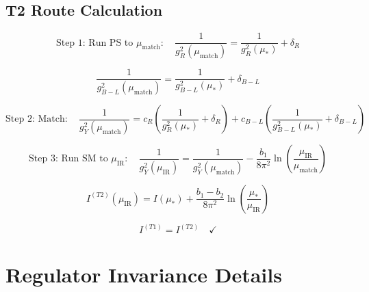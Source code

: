 \documentclass[11pt,a4paper]{article}
\theoremstyle{definition}
\begin{document}
\subsection{T2 Route Calculation}
\label{subsec:T2_detail}

\begin{equation}
\label{eq:T2_step1}
\text{Step 1: Run PS to } \mu_{\text{match}}: \quad \frac{1}{g_R^2(\mu_{\text{match}})} = \frac{1}{g_R^2(\mu_*)} + \delta_R
\end{equation}

\begin{equation}
\label{eq:T2_step2}
\frac{1}{g_{B-L}^2(\mu_{\text{match}})} = \frac{1}{g_{B-L}^2(\mu_*)} + \delta_{B-L}
\end{equation}

\begin{equation}
\label{eq:T2_step3}
\text{Step 2: Match}: \quad \frac{1}{g_Y^2(\mu_{\text{match}})} = c_R\left(\frac{1}{g_R^2(\mu_*)} + \delta_R\right) + c_{B-L}\left(\frac{1}{g_{B-L}^2(\mu_*)} + \delta_{B-L}\right)
\end{equation}

\begin{equation}
\label{eq:T2_step4}
\text{Step 3: Run SM to } \mu_{\text{IR}}: \quad \frac{1}{g_Y^2(\mu_{\text{IR}})} = \frac{1}{g_Y^2(\mu_{\text{match}})} - \frac{b_1}{8\pi^2}\ln\left(\frac{\mu_{\text{IR}}}{\mu_{\text{match}}}\right)
\end{equation}

\begin{equation}
\label{eq:T2_result}
I^{(T2)}(\mu_{\text{IR}}) = I(\mu_*) + \frac{b_1 - b_2}{8\pi^2}\ln\left(\frac{\mu_*}{\mu_{\text{IR}}}\right)
\end{equation}

\begin{equation}
\label{eq:T1_T2_match}
I^{(T1)} = I^{(T2)} \quad \checkmark
\end{equation}

\section{Regulator Invariance Details}
\label{app:regulator}
\end{document}
